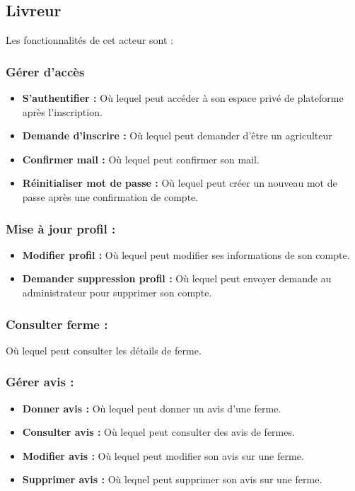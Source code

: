 \documentclass[16pt,fleqn]{article} %
\begin{document}
\subsection{Livreur}
Les fonctionnalités de cet acteur sont :
\subsubsection{Gérer d'accès}
\begin{itemize}
    \item \textbf{S'authentifier :} Où lequel peut accéder à son espace privé de plateforme après l'inscription.
    \item \textbf{Demande d'inscrire :} Où lequel peut demander d'être un agriculteur
    \item \textbf{Confirmer mail :} Où lequel peut confirmer son mail.
    \item \textbf{Réinitialiser mot de passe :} Où lequel peut créer un nouveau mot de passe après une confirmation de compte.
\end{itemize}
\subsubsection{Mise à jour profil :}
\begin{itemize}
    \item \textbf{Modifier profil :} Où lequel peut modifier ses informations de son compte.
    \item \textbf{Demander suppression profil :} Où lequel peut envoyer demande au administrateur pour supprimer son compte.
\end{itemize}

\subsubsection{Consulter ferme :}
Où lequel peut consulter les détails de ferme.

\subsubsection{Gérer avis :}
\begin{itemize}
    \item \textbf{Donner avis :} Où lequel peut donner un avis d'une ferme.
    \item \textbf{Consulter avis :} Où lequel peut consulter des avis de fermes.
    \item \textbf{Modifier avis :} Où lequel peut modifier son avis sur une ferme.
    \item \textbf{Supprimer avis :} Où lequel peut supprimer son avis sur une ferme.
\end{itemize}
\end{document}
